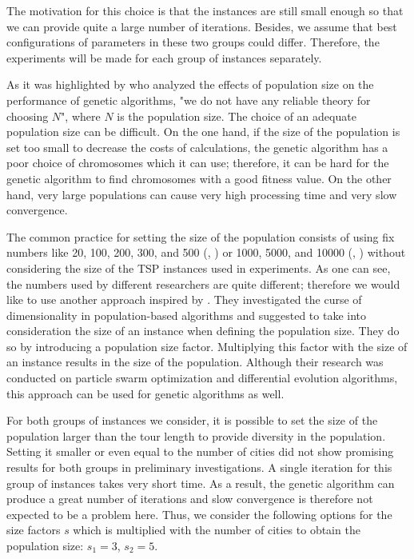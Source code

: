 The motivation for this choice is that the instances are still small enough so that we can provide quite a large number of iterations. Besides, we assume that best configurations of parameters in these two groups could differ. Therefore, the experiments will be made for each group of instances separately.\par

As it was highlighted by \citeauthor{zhang2010effects} \cite{zhang2010effects} who analyzed the effects of population size on the performance of genetic algorithms, "we do not have any reliable theory for choosing $N$", where $N$ is the population size. The choice of an adequate population size can be difficult. On the one hand, if the size of the population is set too small to decrease the costs of calculations, the genetic algorithm has a poor choice of chromosomes which it can use; therefore, it can be hard for the genetic algorithm to find chromosomes with a good fitness value. On the other hand, very large populations can cause very high processing time and very slow convergence. \par 

The common practice for setting the size of the population consists of using fix numbers like 20, 100, 200, 300, and 500 (\citeauthor{zhang2010effects}, \cite{zhang2010effects}) or 1000, 5000, and 10000 (\citeauthor{rexhepi2013analysis}, \cite{rexhepi2013analysis}) without considering the size of the TSP instances used in experiments. As one can see, the numbers used by different researchers are quite different; therefore we would like to use another approach inspired by \citeauthor{chen2015measuring} \cite{chen2015measuring}. They investigated the curse of dimensionality in population-based algorithms and suggested to take into consideration the size of an instance when defining the population size. They do so by introducing a population size factor. Multiplying this factor with the size of an instance results in the size of the population. Although their research was conducted on particle swarm optimization and differential evolution algorithms, this approach can be used for genetic algorithms as well. \par 

For both groups of instances we consider, it is possible to set the size of the population larger than the tour length to provide diversity in the population. Setting it smaller or even equal to the number of cities did not show promising results for both groups in preliminary investigations. A single iteration for this group of instances takes very short time. As a result, the genetic algorithm can produce a great number of iterations and slow convergence is therefore not expected to be a problem here. Thus, we consider the following options for the size factors $s$ which is multiplied with the number of cities to obtain the population size: $s_{1} = 3$,  $s_{2} = 5$. 


